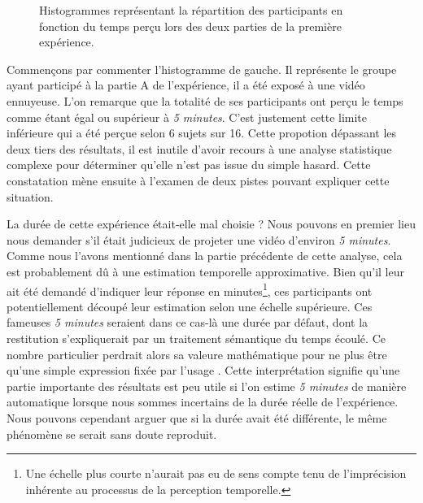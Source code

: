 \documentclass[12pt,fleqn,oneside,french,openany]{book} %
\begin{document}
\begin{figure}[h!]
\centering
\begin{minipage}[t]{.49\textwidth}
\end{minipage}
\hfill
\begin{minipage}[t]{.49\textwidth}
\end{minipage}
\caption{Histogrammes représentant la répartition des participants en fonction du temps perçu lors des deux parties de la première expérience.}
\end{figure}

Commençons par commenter l'histogramme de gauche. Il représente le groupe ayant participé à la partie A de l'expérience, il a été exposé à une vidéo ennuyeuse. L'on remarque que la totalité de ses participants ont perçu le temps comme étant égal ou supérieur à \emph{5 minutes}. C'est justement cette limite inférieure qui a été perçue selon 6 sujets sur 16. Cette propotion dépassant les deux tiers des résultats, il est inutile d'avoir recours à une analyse statistique complexe pour déterminer qu'elle n'est pas issue du simple hasard. Cette constatation mène ensuite à l'examen de deux pistes pouvant expliquer cette situation.

La durée de cette expérience était-elle mal choisie ? Nous pouvons en premier lieu nous demander s'il était judicieux de projeter une vidéo d'environ \emph{5 minutes}. Comme nous l'avons mentionné dans la partie précédente de cette analyse, cela est probablement dû à une estimation temporelle approximative. Bien qu'il leur ait été demandé d'indiquer leur réponse en minutes\footnote{Une échelle plus courte n'aurait pas eu de sens compte tenu de l'imprécision inhérente au processus de la perception temporelle.}, ces participants ont potentiellement découpé leur estimation selon une échelle supérieure. Ces fameuses \emph{5 minutes} seraient dans ce cas-là une durée par défaut, dont la restitution s'expliquerait par un traitement sémantique du temps écoulé. Ce nombre particulier perdrait alors sa valeure mathématique pour ne plus être qu'une simple expression fixée par l'usage \cite{durand1970}. Cette interprétation signifie qu'une partie importante des résultats est peu utile si l'on estime \emph{5 minutes} de manière automatique lorsque nous sommes incertains de la durée réelle de l'expérience. Nous pouvons cependant arguer que si la durée avait été différente, le même phénomène se serait sans doute reproduit. 
\end{document}
